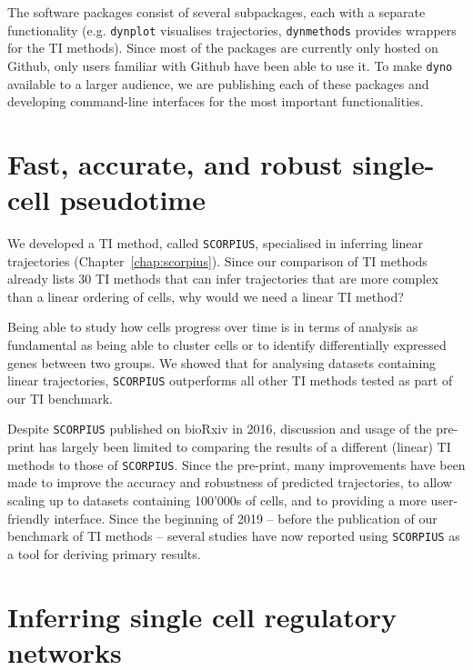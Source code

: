 The software packages consist of several subpackages, each with a separate functionality (e.g. \texttt{dynplot} visualises trajectories, \texttt{dynmethods} provides wrappers for the TI methods). Since most of the packages are currently only hosted on Github, only users familiar with Github have been able to use it. To make \texttt{dyno} available to a larger audience, we are publishing each of these packages and developing command-line interfaces for the most important functionalities.



\section{Fast, accurate, and robust single-cell pseudotime}

We developed a TI method, called \texttt{SCORPIUS}, specialised in inferring linear trajectories (Chapter~\ref{chap:scorpius}). Since our comparison of TI methods already lists 30 TI methods that can infer trajectories that are more complex than a linear ordering of cells, why would we need a linear TI method?

Being able to study how cells progress over time is in terms of analysis as fundamental as being able to cluster cells or to identify differentially expressed genes between two groups. We showed that for analysing datasets containing linear trajectories, \texttt{SCORPIUS} outperforms all other TI methods tested as part of our TI benchmark. 

Despite \texttt{SCORPIUS} published on bioRxiv in 2016, discussion and usage of the pre-print has largely been limited to comparing the results of a different (linear) TI methods to those of \texttt{SCORPIUS}. Since the pre-print, many improvements have been made to improve the accuracy and robustness of predicted trajectories, to allow scaling up to datasets containing 100'000s of cells, and to providing a more user-friendly interface. Since the beginning of 2019 -- before the publication of our benchmark of TI methods -- several studies have now reported using \texttt{SCORPIUS} as a tool for deriving primary results\cite{damond_maphumantype_2019, cheng_multifactorialheterogeneityvirusspecific_2019, tibbitt_singlecellrnasequencing_2019, hove_singlecellatlasmouse_2019, wouters_singlecellgeneregulatory_2019, reimegard_combinedmrnaprotein_2019}.


\section{Inferring single cell regulatory networks}

